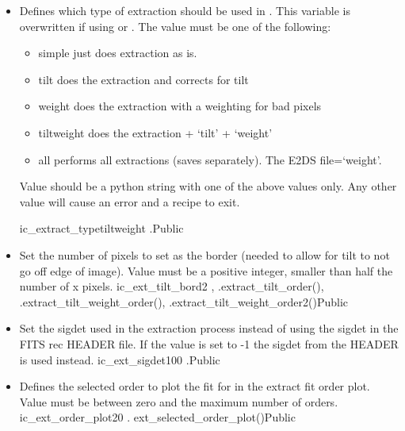 \begin{itemize}
\item {} 
{Defines which type of extraction should be used in \calextractRAW. This variable is overwritten if using \calextractRAWAB or \calextractRAWC. The value must be one of the following:
\begin{itemize}
\item simple \dotfill just does extraction as is.
\item tilt \dotfill does the extraction and corrects for tilt
\item weight \dotfill does the extraction with a weighting for bad pixels
\item tiltweight \dotfill does the extraction + `tilt' + `weight'
\item all \dotfill performs all extractions (saves separately). The E2DS file=`weight'.
\end{itemize}
Value should be a python string with one of the above values only. Any other value will cause an error and a recipe to exit.
}
{ic\_extract\_type}{tiltweight}
{\calextractRAW}{\constantsfile}{\calextractRAW.\progMAIN}{Public}


\item {}
{Set the number of pixels to set as the border (needed to allow for tilt to not go off edge of image). Value must be a positive integer, smaller than half the number of x pixels.}
{ic\_ext\_tilt\_bord}{2}
{\calextractRAW, \calFFraw}{\constantsfile}{\spirouEXTOR.extract\_tilt\_order(), \spirouEXTOR.extract\_tilt\_weight\_order(), \spirouEXTOR.extract\_tilt\_weight\_order2()}{Public}

\item {} 
{Set the sigdet used in the extraction process instead of using the sigdet in the FITS rec HEADER file. If the value is set to -1 the sigdet from the HEADER is used instead.}
{ic\_ext\_sigdet}{100}
{\calextractRAW}{\constantsfile}{\calextractRAW.\progMAIN}{Public}

\item {}
{Defines the selected order to plot the fit for in the extract fit order plot. Value must be between zero and the maximum number of orders.}
{ic\_ext\_order\_plot}{20}
{\calextractRAW}{\constantsfile}{\spirouPlot. ext\_selected\_order\_plot()}{Public}

\end{itemize}







